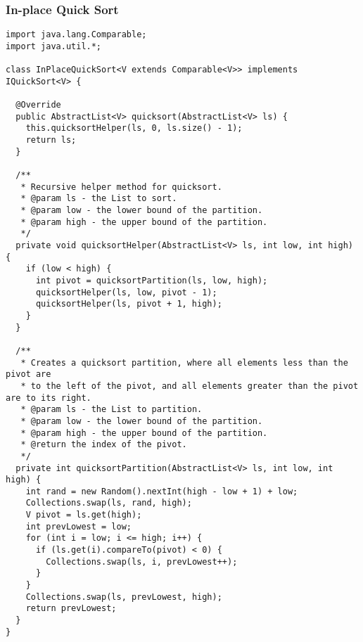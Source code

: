 \subsubsection*{In-place Quick Sort}
\begin{lstlisting}[language=MyJava]
import java.lang.Comparable;
import java.util.*;

class InPlaceQuickSort<V extends Comparable<V>> implements IQuickSort<V> {

  @Override
  public AbstractList<V> quicksort(AbstractList<V> ls) {
    this.quicksortHelper(ls, 0, ls.size() - 1);
    return ls;
  }

  /**
   * Recursive helper method for quicksort.
   * @param ls - the List to sort.
   * @param low - the lower bound of the partition.
   * @param high - the upper bound of the partition.
   */
  private void quicksortHelper(AbstractList<V> ls, int low, int high) {
    if (low < high) {
      int pivot = quicksortPartition(ls, low, high);
      quicksortHelper(ls, low, pivot - 1);
      quicksortHelper(ls, pivot + 1, high);
    }
  }

  /**
   * Creates a quicksort partition, where all elements less than the pivot are
   * to the left of the pivot, and all elements greater than the pivot are to its right.
   * @param ls - the List to partition.
   * @param low - the lower bound of the partition.
   * @param high - the upper bound of the partition.
   * @return the index of the pivot.
   */
  private int quicksortPartition(AbstractList<V> ls, int low, int high) {
    int rand = new Random().nextInt(high - low + 1) + low;
    Collections.swap(ls, rand, high);
    V pivot = ls.get(high);
    int prevLowest = low;
    for (int i = low; i <= high; i++) {
      if (ls.get(i).compareTo(pivot) < 0) {
        Collections.swap(ls, i, prevLowest++);
      }
    }
    Collections.swap(ls, prevLowest, high);
    return prevLowest;
  }
}
\end{lstlisting}
